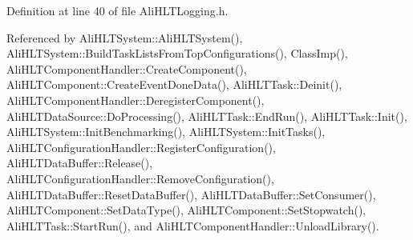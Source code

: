 Definition at line 40 of file Ali\-HLTLogging.h.

Referenced by Ali\-HLTSystem::Ali\-HLTSystem(), Ali\-HLTSystem::Build\-Task\-Lists\-From\-Top\-Configurations(), Class\-Imp(), Ali\-HLTComponent\-Handler::Create\-Component(), Ali\-HLTComponent::Create\-Event\-Done\-Data(), Ali\-HLTTask::Deinit(), Ali\-HLTComponent\-Handler::Deregister\-Component(), Ali\-HLTData\-Source::Do\-Processing(), Ali\-HLTTask::End\-Run(), Ali\-HLTTask::Init(), Ali\-HLTSystem::Init\-Benchmarking(), Ali\-HLTSystem::Init\-Tasks(), Ali\-HLTConfiguration\-Handler::Register\-Configuration(), Ali\-HLTData\-Buffer::Release(), Ali\-HLTConfiguration\-Handler::Remove\-Configuration(), Ali\-HLTData\-Buffer::Reset\-Data\-Buffer(), Ali\-HLTData\-Buffer::Set\-Consumer(), Ali\-HLTComponent::Set\-Data\-Type(), Ali\-HLTComponent::Set\-Stopwatch(), Ali\-HLTTask::Start\-Run(), and Ali\-HLTComponent\-Handler::Unload\-Library().